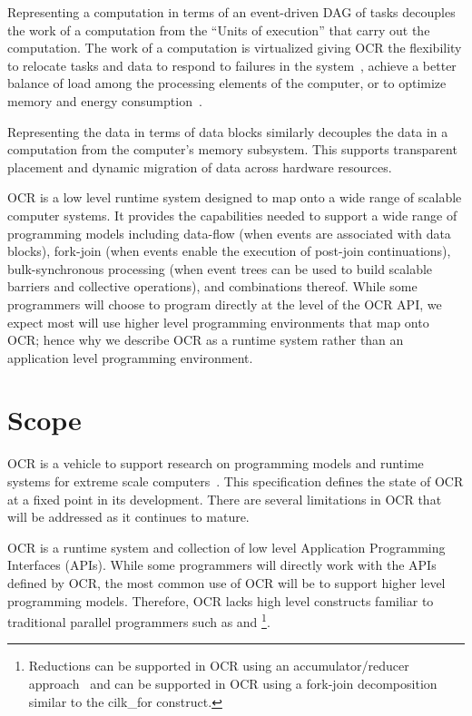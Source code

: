 Representing a computation in terms of an event-driven DAG of tasks
decouples the work of a computation
from the ``Units of execution'' that carry out the computation. The work
of a computation is virtualized giving OCR the flexibility to relocate tasks and data
to respond to failures in the system~\cite{Vrvilo14}, achieve a better balance of load
among the processing elements of the computer, or to optimize memory
and energy consumption~\cite{GZCS10,Guo10,CTBCCGYS13,SbBS14}.

Representing the data in terms of data blocks similarly
decouples the data in a computation from the computer's memory subsystem.
This supports transparent placement and dynamic migration of data
across hardware resources.

OCR is a low level runtime system designed to map onto a wide range of scalable
computer systems.
It provides the capabilities needed to support a wide range of programming models
including data-flow (when events are associated with data blocks),
fork-join (when events enable the execution of post-join
continuations), bulk-synchronous processing (when event trees can be
used to build scalable barriers and collective operations), and
combinations thereof. While some programmers will choose to program directly
at the level of the OCR API, we expect most will use higher level
programming environments that map onto OCR; hence why we describe OCR as a
runtime system rather than an application level programming environment.

\section{Scope}
\label{sec:Scope}

OCR is a vehicle to support research on programming models and
runtime systems for extreme scale
computers~\cite{ExascaleSoftwareStudy2009,SaHS10}. This specification
defines the state of OCR at a fixed point in its development. There
are several limitations in OCR that will be addressed as it continues to
mature.

OCR is a runtime system and collection of low level Application
Programming Interfaces (APIs). While some programmers will directly
work with the APIs defined by OCR, the most common use of OCR will be
to support higher level programming models. Therefore, OCR lacks high
level constructs familiar to traditional parallel programmers such as
 and \footnote{Reductions can be
supported in OCR using an accumulator/reducer
approach~\cite{Frigo:2009:ROC:1583991.1584017,SCZS13} and
 can be supported in OCR
using a fork-join decomposition similar to the cilk\_for construct.}.

